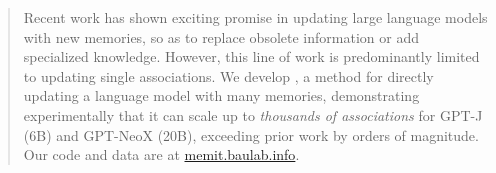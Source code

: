 \begin{abstract}
\vspace{-5pt}
Recent work has shown exciting promise in updating large language models with new memories, so as to replace obsolete information or add specialized knowledge. However, this line of work is predominantly limited to updating single associations. We develop \method, a method for directly updating a language model with many memories, demonstrating experimentally that it can scale up to \textit{thousands of associations} for GPT-J (6B) and GPT-NeoX (20B), exceeding prior work by orders of magnitude. Our code and data are at \href{https://memit.baulab.info}{memit.baulab.info}.
\vspace{-6pt}
\end{abstract}